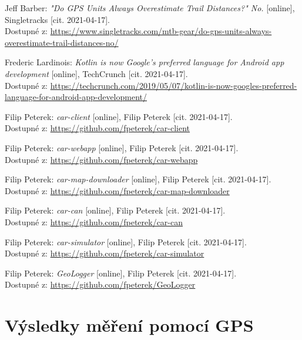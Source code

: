 \documentclass[czech, bachelor]{diploma}
\begin{document}
\begin{thebibliography}{20}
Jeff Barber: \textit{"Do GPS Units Always Overestimate Trail Distances?" No.} [online], Singletracks [cit. 2021-04-17]. \\
Dostupné z:
\url{https://www.singletracks.com/mtb-gear/do-gps-units-always-overestimate-trail-distances-no/}

Frederic Lardinois: \textit{Kotlin is now Google's preferred language for Android app development} [online],
TechCrunch [cit. 2021-04-17]. \\
Dostupné z:
\url{https://techcrunch.com/2019/05/07/kotlin-is-now-googles-preferred-language-for-android-app-development/}

Filip Peterek: \textit{car-client} [online], Filip Peterek [cit. 2021-04-17]. \\
Dostupné z:
\url{https://github.com/fpeterek/car-client}

Filip Peterek: \textit{car-webapp} [online], Filip Peterek [cit. 2021-04-17]. \\
Dostupné z:
\url{https://github.com/fpeterek/car-webapp}

Filip Peterek: \textit{car-map-downloader} [online], Filip Peterek [cit. 2021-04-17]. \\
Dostupné z:
\url{https://github.com/fpeterek/car-map-downloader}

Filip Peterek: \textit{car-can} [online], Filip Peterek [cit. 2021-04-17]. \\
Dostupné z:
\url{https://github.com/fpeterek/car-can}

Filip Peterek: \textit{car-simulator} [online], Filip Peterek [cit. 2021-04-17]. \\
Dostupné z:
\url{https://github.com/fpeterek/car-simulator}

Filip Peterek: \textit{GeoLogger} [online], Filip Peterek [cit. 2021-04-17]. \\
Dostupné z:
\url{https://github.com/fpeterek/GeoLogger}

\end{thebibliography}

\appendix

\chapter{Výsledky měření pomocí GPS} \label{gps-measuring-results-all}
\end{document}
